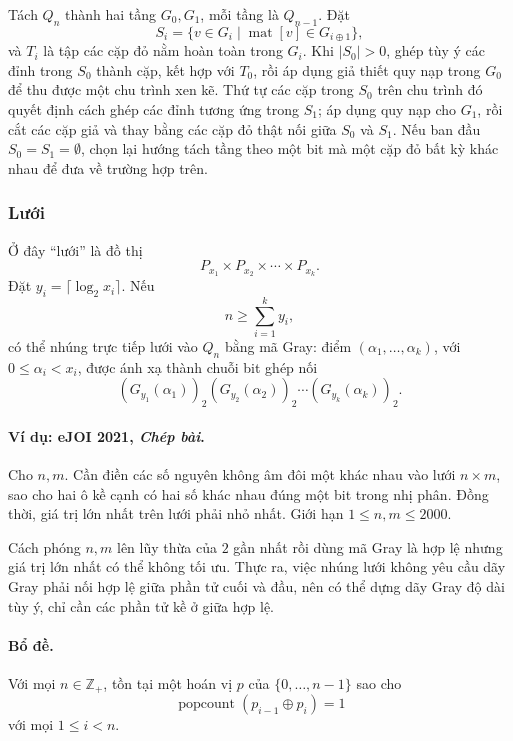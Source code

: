 \documentclass[11pt]{article}
\begin{document}
Tách \(Q_n\) thành hai tầng \(G_0,G_1\), mỗi tầng là \(Q_{n-1}\). Đặt
\[
  S_i=\{v\in G_i\mid \operatorname{mat}[v]\in G_{i\oplus 1}\},
\]
và \(T_i\) là tập các cặp đỏ nằm hoàn toàn trong \(G_i\). Khi
\(|S_0|>0\), ghép tùy ý các đỉnh trong \(S_0\) thành cặp, kết hợp với \(T_0\),
rồi áp dụng giả thiết quy nạp trong \(G_0\) để thu được một chu trình xen kẽ.
Thứ tự các cặp trong \(S_0\) trên chu trình đó quyết định cách ghép các đỉnh
tương ứng trong \(S_1\); áp dụng quy nạp cho \(G_1\), rồi cắt các cặp giả và
thay bằng các cặp đỏ thật nối giữa \(S_0\) và \(S_1\). Nếu ban đầu
\(S_0=S_1=\emptyset\), chọn lại hướng tách tầng theo một bit mà một cặp đỏ
bất kỳ khác nhau để đưa về trường hợp trên.

\subsubsection{Lưới}

Ở đây ``lưới'' là đồ thị
\[
  P_{x_1}\times P_{x_2}\times\cdots\times P_{x_k}.
\]
Đặt \(y_i=\lceil\log_2 x_i\rceil\). Nếu
\[
  n\ge \sum_{i=1}^k y_i,
\]
có thể nhúng trực tiếp lưới vào \(Q_n\) bằng mã Gray: điểm
\((\alpha_1,\ldots,\alpha_k)\), với \(0\le\alpha_i<x_i\), được ánh xạ thành
chuỗi bit ghép nối
\[
  (G_{y_1}(\alpha_1))_2
  (G_{y_2}(\alpha_2))_2
  \cdots
  (G_{y_k}(\alpha_k))_2.
\]

\paragraph{Ví dụ: eJOI 2021, \emph{Chép bài}.}
Cho \(n,m\). Cần điền các số nguyên không âm đôi một khác nhau vào lưới
\(n\times m\), sao cho hai ô kề cạnh có hai số khác nhau đúng một bit trong
nhị phân. Đồng thời, giá trị lớn nhất trên lưới phải nhỏ nhất. Giới hạn
\(1\le n,m\le 2000\).

Cách phóng \(n,m\) lên lũy thừa của \(2\) gần nhất rồi dùng mã Gray là hợp lệ
nhưng giá trị lớn nhất có thể không tối ưu. Thực ra, việc nhúng lưới không yêu
cầu dãy Gray phải nối hợp lệ giữa phần tử cuối và đầu, nên có thể dựng dãy
Gray độ dài tùy ý, chỉ cần các phần tử kề ở giữa hợp lệ.

\paragraph{Bổ đề.}
Với mọi \(n\in\mathbb Z_+\), tồn tại một hoán vị \(p\) của
\(\{0,\ldots,n-1\}\) sao cho
\[
  \operatorname{popcount}(p_{i-1}\oplus p_i)=1
\]
với mọi \(1\le i<n\).
\end{document}

